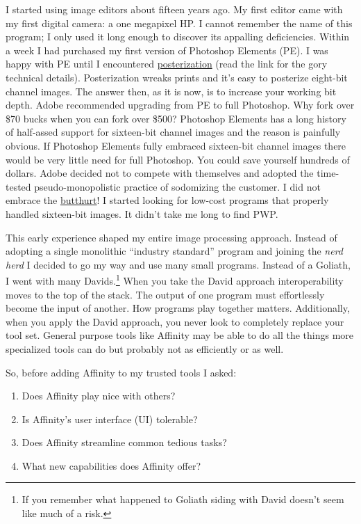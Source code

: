 I started using image editors about fifteen years ago. My first editor
came with my first digital camera: a one megapixel HP. I cannot remember
the name of this program; I only used it long enough to discover its
appalling deficiencies. Within a week I had purchased my first version
of Photoshop Elements (PE). I was happy with PE until I encountered
\href{https://en.wikipedia.org/wiki/Posterization}{posterization} (read
the link for the gory technical details). Posterization wreaks prints
and it's easy to posterize eight-bit channel images. The answer then, as
it is now, is to increase your working bit depth. Adobe recommended
upgrading from PE to full Photoshop. Why fork over \$70 bucks when you
can fork over \$500? Photoshop Elements has a long history of half-assed
support for sixteen-bit channel images and the reason is painfully
obvious. If Photoshop Elements fully embraced sixteen-bit channel images
there would be very little need for full Photoshop. You could save
yourself hundreds of dollars. Adobe decided not to compete with
themselves and adopted the time-tested pseudo-monopolistic practice of
sodomizing the customer. I did not embrace the
\href{http://www.urbandictionary.com/define.php?term=ButtHurt}{butthurt}!
I started looking for low-cost programs that properly handled
sixteen-bit images. It didn't take me long to find PWP.

This early experience shaped my entire image processing approach.
Instead of adopting a single monolithic ``industry standard'' program
and joining the \emph{nerd herd} I decided to go my way and use many
small programs. Instead of a Goliath, I went with many %
Davids.\footnote{If you remember what happened to Goliath siding with David doesn't
seem like much of a risk.} When you take the
David approach interoperability moves to the top of the stack. The
output of one program must effortlessly become the input of another. How
programs play together matters. Additionally, when you apply the David
approach, you never look to completely replace your tool set. General
purpose tools like Affinity may be able to do all the things more
specialized tools can do but probably not as efficiently or as well.

So, before adding Affinity to my trusted tools I asked:

\begin{enumerate}
\itemsep1pt\parskip0pt
\def\labelenumi{\arabic{enumi}.}
\item
  Does Affinity play nice with others?
\item
  Is Affinity's user interface (UI) tolerable?
\item
  Does Affinity streamline common tedious tasks?
\item
  What new capabilities does Affinity offer?
\end{enumerate}

